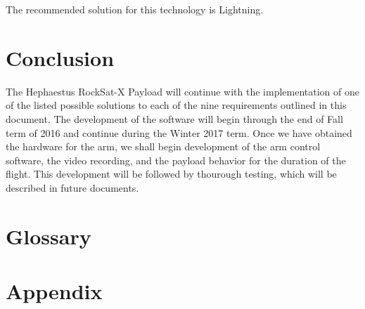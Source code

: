 \documentclass[letterpaper,10pt]{article}
\begin{document}
The recommended solution for this technology is Lightning.

\section{Conclusion}
The Hephaestus RockSat-X Payload will continue with the implementation of one of the listed possible 
solutions to each of the nine requirements outlined in this document.
The development of the software will begin through the end of Fall term of 2016 and continue during 
the Winter 2017 term. Once we have obtained the hardware for the arm, we shall begin development of the 
arm control software, the video recording, and the payload behavior for the duration of the flight. This 
development will be followed by thourough testing, which will be described in future documents.

\section{Glossary}
\glsaddall
\printglossaries

\section{Appendix}

\end{document}
